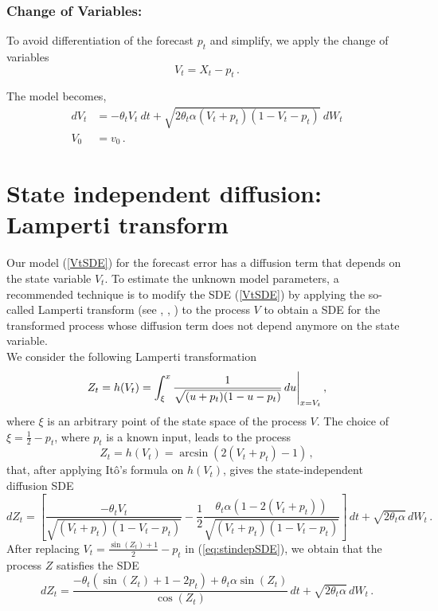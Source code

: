 \documentclass[11pt,english]{article}
\begin{document}
\subsubsection*{Change of Variables:}
To avoid differentiation of the forecast $p_t$ and simplify, we apply the change of variables $$V_t = X_t - p_t \,.$$ 

The  model becomes,
\begin{align}
dV_t &=  - \theta_t V_t \  dt + \sqrt{2 \theta_t \alpha (V_t +p_t ) (1-V_t-p_t)} \  dW_t  \nonumber \\ %
V_0 & = v_0 \,. \label{VtSDE}
\end{align}


\section{State independent diffusion: Lamperti transform} \label{Section_3}

Our model (\ref{VtSDE}) for the forecast error has a diffusion term that depends on the state variable $V_t$. To estimate the unknown model parameters, a recommended technique is to modify the SDE (\ref{VtSDE}) by applying the so-called Lamperti transform (see \cite[40--41]{iacus1}, \cite{moma}, \cite[98--100]{saso}) to the process $V$ to obtain a SDE for the transformed process whose diffusion term does not depend anymore on the state variable. \\

We consider the following Lamperti transformation 
\begin{equation}
Z_t = h(V_t) = \int_{\xi}^{x} \frac{1}{\sqrt{(u + p_t)(1 - u - p_t)}} \,du \Bigg{\vert}_{x = V_t} \,,
\end{equation}
where $\xi$ is an arbitrary point of the state space of the process $V$. The choice of $\xi = \frac{1}{2} - p_t$, where $p_t$ is a known input, leads to the process 
\begin{equation}
Z_t = h(V_t) = \arcsin (2(V_t + p_t) -1)\,,
\end{equation}
that, after applying It\^{o}'s formula on $h(V_t)$, gives the state-independent diffusion SDE
\begin{equation}
dZ_t = \left[  \frac{- \theta_t V_t}{\sqrt{(V_t + p_t)(1 - V_t - p_t)}} - \frac{1}{2} \frac{\theta_t \alpha \left( 1 - 2 (V_t + p_t)\right)}{\sqrt{(V_t + p_t)(1 - V_t - p_t)}}  \right] \,dt + \sqrt{2 \theta_t \alpha}\, dW_t \,. \label{eq:stindepSDE}
\end{equation}
After replacing $V_t = \frac{\sin(Z_t) + 1}{2} - p_t$ in (\ref{eq:stindepSDE}), we obtain that the  process $Z$ satisfies the SDE
\begin{equation}
dZ_t = \frac{- \theta_t (\sin(Z_t) + 1 - 2 p_t) + \theta_t \alpha \sin{(Z_t)}}{\cos{(Z_t)}} \,dt + \sqrt{2 \theta_t \alpha}\, dW_t \,. 
\end{equation}
\end{document}
